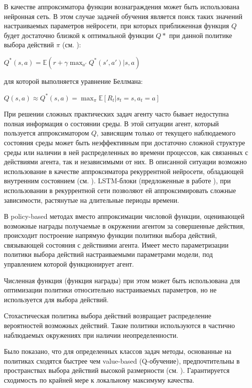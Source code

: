 В качестве аппроксиматора функции вознаграждения может быть использована нейронная сеть. В этом случае задачей обучения является поиск таких значений настраиваемых параметров нейросети, при которых приближенная функция $Q$ будет достаточно близкой к оптимальной функции $Q*$ при данной политике выбора действий $\pi$ (см. ):


$Q^{*}(s,a)=\mathbb{E}(r+\gamma \max_{a'}Q^{*}(s',a')|s,a) $


для которой выполняется уравнение Беллмана:

$Q(s,a)\approx Q^{*}(s,a)=\max_{\pi}\mathbb{E}\left [ R_t|s_t=s,a_t=a \right ]$

При решении сложных практических задач агенту часто бывает недоступна полная информация о состоянии среды. В этой ситуации агент, который пользуется аппроксиматором $Q$, зависящим только от текущего наблюдаемого состояния среды может быть неэффективным при достаточно сложной структуре среды или наличии в ней распределенных во времени процессов, как связанных с действиями агента, так и независимыми от них. В описанной ситуации возможно использование в качестве аппроксиматора рекуррентной нейросети, обладающей внутренним состоянием (см. ). LSTM-блоки (предложенные в работе ), при использовании в рекуррентной сети позволяют ей аппроксимировать сложные зависимости, растянутые на длительные периоды времени.


В policy-based методах вместо аппроксимации числовой функции, оценивающей возможные награды получаемые в окружении агентом за совершенные действия, происходит построение напрямую функции политики выбора действий, связывающей состояния с действиями агента. Имеет место параметризации политики выбора действий настраиваемыми параметрами модели, под управлением которой функционирует агент.

Численная функция (функция награды) при этом может быть использована для оптимизации политики относительно настраиваемых параметров, но не используется для выбора действий.

Стохастическая политика выбора действий возвращает распределение вероятностей возможных действий. Такие политики используются в частично наблюдаемых окружениях при наличии неопределенности.


Было показано, что для определенных классов задач методы, основанные на политиках сходятся быстрее чем value-based (Q-обучение), предпочтительны в пространствах выбора действий высокой размерности (см. ). Гарантируется сходимость по крайней мере к локальному максимуму качества.



